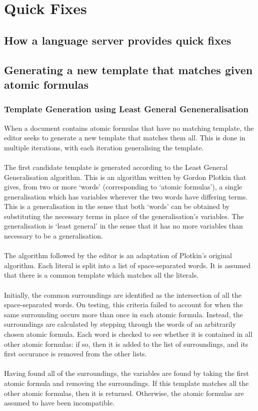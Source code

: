 \documentclass[../main.tex]{subfiles}
\begin{document}
{\section{Quick Fixes}
\subsection{How a language server provides quick fixes}

\subsection{Generating a new template that matches given atomic formulas}
\subsubsection{Template Generation using Least General Geneneralisation}
When a document contains atomic formulas that have no matching template, the editor seeks to generate a new template that matches them all. This is done in multiple iterations, with each iteration generalising the template.
\\
\\
The first candidate template is generated according to the Least General Generalisation algorithm. This is an algorithm written by Gordon Plotkin \cite[p~.155]{lgg_plotkin} that gives, from two or more `words' (corresponding to `atomic formulas'), a single generalisation which has variables wherever the two words have differing terms. This is a generalisation in the sense that both `words' can be obtained by substituting the necessary terms in place of the generalisation's variables. The generalisation is `least general' in the sense that it has no more variables than necessary to be a generalisation.
\\
\\
The algorithm followed by the editor is an adaptation of Plotkin's original algorithm. Each literal is split into a list of space-separated words. It is assumed that there is a common template which matches all the literals. 
\\
\\
Initially, the common surroundings are identified as the intersection of all the space-separated words. On testing, this criteria failed to account for when the same surrounding occurs more than once in each atomic formula. Instead, the surroundings are calculated by stepping through the words of an arbitrarily chosen atomic formula. Each word is checked to see whether it is contained in all other atomic formulas: if so, then it is added to the list of surroundings, and its first occurance is removed from the other lists.
\\ 
\\
Having found all of the surroundings, the variables are found by taking the first atomic formula and removing the surroundings. If this template matches all the other atomic formulas, then it is returned. Otherwise, the atomic formulas are assumed to have been incompatible.

}
\end{document}
